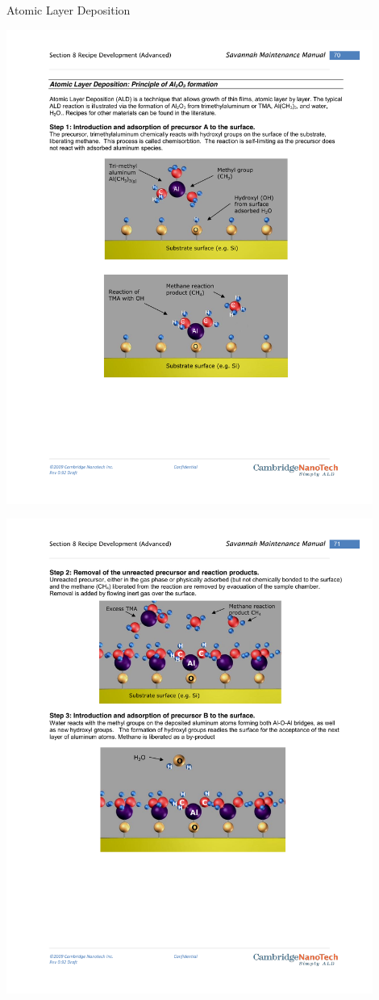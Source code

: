\documentclass[professionalfont]{beamer}
\begin{document}
\begin{frame}{Atomic Layer Deposition}
\begin{overprint}
		\centerline{\includegraphics[width=0.9\textwidth]{./Graphics/Synthesis/TMA2}}
		\centerline{\includegraphics[width=0.9\textwidth]{./Graphics/Synthesis/TMA3}}

\end{overprint}
\end{frame}
\end{document}
